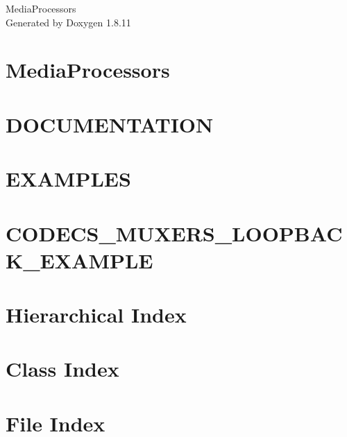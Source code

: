 \documentclass[twoside]{book}
\newcommand{\+}{\discretionary{\mbox{\scriptsize$\hookleftarrow$}}{}{}}
\newcommand{\clearemptydoublepage}{%
  \newpage{\pagestyle{empty}\cleardoublepage}%
}
\begin{document}
\hypersetup{pageanchor=false,
             bookmarksnumbered=true,
             pdfencoding=unicode
            }
\begin{titlepage}
\vspace*{7cm}
\begin{center}%
{\Large Media\+Processors }\\
\vspace*{1cm}
{\large Generated by Doxygen 1.8.11}\\
\end{center}
\end{titlepage}
\clearemptydoublepage
\tableofcontents
\clearemptydoublepage
{}
\hypersetup{pageanchor=true}

\chapter{Media\+Processors}
\label{index}\hypertarget{index}{}
\chapter{D\+O\+C\+U\+M\+E\+N\+T\+A\+T\+I\+ON}
\label{md_DOCUMENTATION}
\hypertarget{md_DOCUMENTATION}{}

\chapter{E\+X\+A\+M\+P\+L\+ES}
\label{md_EXAMPLES}
\hypertarget{md_EXAMPLES}{}

\chapter{C\+O\+D\+E\+C\+S\+\_\+\+M\+U\+X\+E\+R\+S\+\_\+\+L\+O\+O\+P\+B\+A\+C\+K\+\_\+\+E\+X\+A\+M\+P\+LE}
\label{md_CODECS_MUXERS_LOOPBACK_EXAMPLE}
\hypertarget{md_CODECS_MUXERS_LOOPBACK_EXAMPLE}{}

\chapter{Hierarchical Index}

\chapter{Class Index}

\chapter{File Index}

\end{document}
